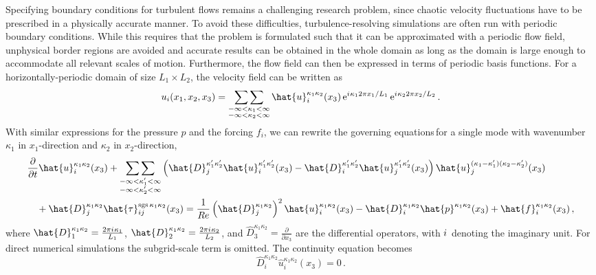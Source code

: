 \documentclass[gmd, manuscript]{copernicus}
\begin{document}
Specifying boundary conditions for turbulent flows remains a challenging research problem, since chaotic velocity fluctuations have to be prescribed in a physically accurate manner.
To avoid these difficulties, turbulence-resolving simulations are often run with periodic boundary conditions.
While this requires that the problem is formulated such that it can be approximated with a periodic flow field, unphysical border regions are avoided and accurate results can be obtained in the whole domain as long as the domain is large enough to accommodate all relevant scales of motion.
Furthermore, the flow field can then be expressed in terms of periodic basis functions.
For a horizontally-periodic domain of size \(L_1 \times L_2\), the velocity field can be written as
\begin{equation}
  u_i(x_1, x_2, x_3) = \mathop{\sum\sum}_{\substack{-\infty < \kappa_1< \infty \\ -\infty < \kappa_2< \infty}} \hat{u}_i^{\kappa_1\kappa_2}(x_3) \, \mathrm{e}^{{i\mkern 1mu}\kappa_12 \pi x_1/L_1} \, \mathrm{e}^{{i\mkern 1mu}\kappa_22 \pi x_2/L_2}
  \,.
\end{equation}
With similar expressions for the pressure \(p\) and the forcing \(f_i\), we can rewrite the governing equations\,for a single mode with wavenumber \(\kappa_1\) in \(x_1\)-direction and \(\kappa_2\) in \(x_2\)-direction,
\begin{equation}
  \begin{aligned}
&\frac{\partial}{\partial t} \hat{u}_i^{\kappa_1\kappa_2}(x_3)
+ \mathop{\sum\sum}_{\substack{-\infty < \kappa_1^\prime < \infty \\ -\infty < \kappa_2^\prime < \infty}}
\left(  \hat{D} _j^{\kappa_1^\prime \kappa_2^\prime} \hat{u}_i^{\kappa_1^\prime \kappa_2^\prime}(x_3) -  \hat{D} _i^{\kappa_1^\prime \kappa_2^\prime} \hat{u}_j^{\kappa_1^\prime \kappa_2^\prime}(x_3) \right)
\hat{u}_j^{(\kappa_1-\kappa_1^\prime)(\kappa_2-\kappa_2^\prime)}(x_3)
\\
&\hspace{1em}
+  \hat{D} _j^{\kappa_1\kappa_2} \hat{\tau}_{ij}^{\mathrm{sgs}\,\kappa_1\kappa_2}(x_3)
= \frac{1}{R \mkern -.2mue} \left(  \hat{D} _j^{\kappa_1\kappa_2} \right)^2 \hat{u}_i^{\kappa_1\kappa_2}(x_3)
-  \hat{D} _i^{\kappa_1\kappa_2} \hat{p}^{\kappa_1\kappa_2}(x_3)
+ \hat{f}_i^{\kappa_1\kappa_2}(x_3)
\,,
  \end{aligned}
  \label{eq:mom-fd}
\end{equation}
where \( \hat{D} _1^{\kappa_1\kappa_2} = \frac{2\pi{i\mkern 1mu}\kappa_1}{L_1}\), \( \hat{D} _2^{\kappa_1\kappa_2} = \frac{2\pi{i\mkern 1mu}\kappa_2}{L_2}\), and \( \hat{D} _3^{\kappa_1\kappa_2}=\frac{\partial}{\partial x_3}\) are the differential operators, with \({i\mkern 1mu}\) denoting the imaginary unit.
For direct numerical simulations the subgrid-scale term is omitted.
The continuity equation becomes
\begin{equation}
 \hat{D} _i^{\kappa_1\kappa_2} \hat{u}_i^{\kappa_1\kappa_2}(x_3) = 0
\,.
\label{eq:cont-fd}
\end{equation}
\end{document}
